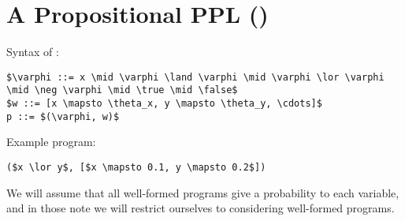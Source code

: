 \documentclass{tufte-handout}
\begin{document}
\section{A Propositional PPL (\prop{})}
Syntax of \prop{}:
\begin{lstlisting}[mathescape=true]
$\varphi ::= x \mid \varphi \land \varphi \mid \varphi \lor \varphi \mid \neg \varphi \mid \true \mid \false$ 
$w ::= [x \mapsto \theta_x, y \mapsto \theta_y, \cdots]$
p ::= $(\varphi, w)$
\end{lstlisting}

Example \prop{} program:

\begin{lstlisting}[mathescape=true]
($x \lor y$, [$x \mapsto 0.1, y \mapsto 0.2$])
\end{lstlisting}

We will assume that all well-formed \prop{} programs give a probability to each
variable, and in those note we will restrict ourselves to considering
well-formed programs. 
\end{document}
